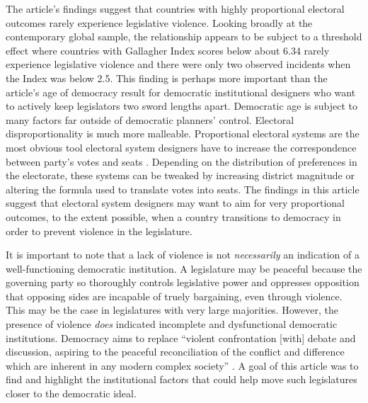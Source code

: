 \documentclass[a4paper]{article}\usepackage[]{graphicx}\usepackage[]{color}
\begin{document}
The article's findings suggest that countries with highly proportional electoral outcomes rarely experience legislative violence. Looking broadly at the contemporary global sample, the relationship appears to be subject to a threshold effect where countries with Gallagher Index scores below about 6.34 rarely experience legislative violence and there were only two observed incidents when the Index was below 2.5. This finding is perhaps more important than the article's age of democracy result for democratic institutional designers who want to actively keep legislators two sword lengths apart. Democratic age is subject to many factors far outside of democratic planners' control. Electoral disproportionality is much more malleable. Proportional electoral systems are the most obvious tool electoral system designers have to increase the correspondence between party's votes and seats \citep{Carey2011}. Depending on the distribution of preferences in the electorate, these systems can be tweaked by increasing district magnitude or altering the formula used to translate votes into seats. The findings in this article suggest that electoral system designers may want to aim for very proportional outcomes, to the extent possible, when a country transitions to democracy in order to prevent violence in the legislature.

It is important to note that a lack of violence is not \emph{necessarily} an indication of a well-functioning democratic institution. A legislature may be peaceful because the governing party so thoroughly controls legislative power and oppresses opposition that opposing sides are incapable of truely bargaining, even through violence. This may be the case in legislatures with very large majorities. However, the presence of violence \emph{does} indicated incomplete and dysfunctional democratic institutions. Democracy aims to replace ``violent confrontation [with] debate and discussion, aspiring to the peaceful reconciliation of the conflict and difference which are inherent in any modern complex society'' \cite[220]{Schwarzmantel2010}. A goal of this article was to find and highlight the institutional factors that could help move such legislatures closer to the democratic ideal.
\end{document}
